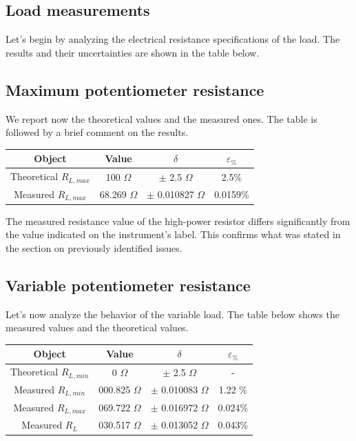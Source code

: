 \documentclass[../main.tex]{subfiles}
\begin{document}

\vspace{1cm}
\subsection{Load measurements}

Let’s begin by analyzing the electrical resistance specifications of the load. The results and their uncertainties are shown in the table below.

\subsection*{Maximum potentiometer resistance}

We report now the theoretical values and the measured ones. The table is followed by a brief comment on the results.

\begin{center}
\begin{tabular}{c c c c}

\textbf{Object} & \textbf{Value} & $\delta$ & $\varepsilon_{\%}$  \\
\hline
Theoretical $R_{L,max}$ & 100 $\Omega$  & $\pm$ 2.5 $\Omega$  & 2.5\%\\ 
\hline
Measured $R_{L,max}$ & 68.269 $\Omega$ &   $\pm$ 0.010827 $\Omega$ & 0.0159\% \\
\end{tabular}
\end{center}

The measured resistance value of the high-power resistor differs significantly from the value indicated on the instrument’s label. This confirms what was stated in the section on previously identified issues.

\subsection*{Variable potentiometer resistance}

Let’s now analyze the behavior of the variable load.
The table below shows the measured values and the theoretical values.

\begin{center}
\begin{tabular}{c c c c}

\textbf{Object} & \textbf{Value} & $\delta$ & $\varepsilon_{\%}$  \\
\hline
Theoretical $R_{L,min}$ & 0 $\Omega$  & $\pm$ 2.5 $\Omega$ & -  \\ 
\hline
Measured $R_{L,min}$ & 000.825 $\Omega$ &   $\pm$  0.010083 $\Omega$ & 1.22 \%\\
\hline
Measured $R_{L,max}$ & 069.722 $\Omega$ &   $\pm$ 0.016972  $\Omega$ & 0.024\%\\
\hline
Measured $R_{L}$ & 030.517 $\Omega$ & $\pm$ 0.013052 $\Omega$ & 0.043\%\\
\end{tabular}
\end{center}
\end{document}
